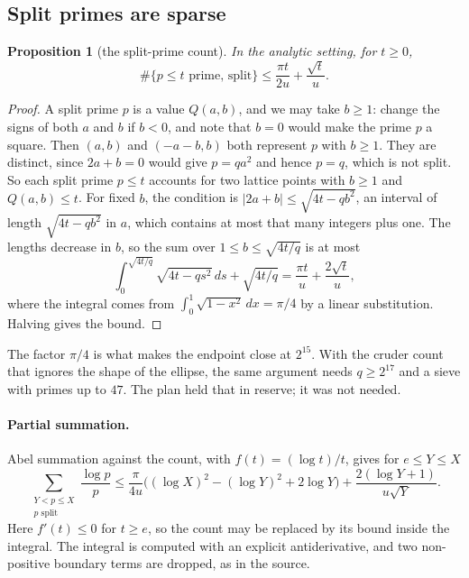 \documentclass[11pt]{article}
\newtheorem{proposition}[theorem]{Proposition}
\theoremstyle{definition}
\begin{document}
\subsection{Split primes are sparse}\label{sec:split}

\begin{proposition}[the split-prime count]\label{prop:count}
In the analytic setting, for $t \ge 0$,
\[
\#\{p \le t \text{ prime, split}\} \le \frac{\pi t}{2u} + \frac{\sqrt t}{u}.
\]
\end{proposition}

\begin{proof}
A split prime $p$ is a value $Q(a, b)$, and we may take $b \ge 1$: change the signs of both $a$ and $b$ if $b < 0$, and note that $b = 0$ would make the prime $p$ a square. Then $(a, b)$ and $(-a-b, b)$ both represent $p$ with $b \ge 1$. They are distinct, since $2a + b = 0$ would give $p = qa^2$ and hence $p = q$, which is not split. So each split prime $p \le t$ accounts for two lattice points with $b \ge 1$ and $Q(a, b) \le t$. For fixed $b$, the condition is $|2a + b| \le \sqrt{4t - qb^2}$, an interval of length $\sqrt{4t - qb^2}$ in $a$, which contains at most that many integers plus one. The lengths decrease in $b$, so the sum over $1 \le b \le \sqrt{4t/q}$ is at most
\[
\int_0^{\sqrt{4t/q}} \sqrt{4t - qs^2}\,ds + \sqrt{4t/q} = \frac{\pi t}{u} + \frac{2\sqrt t}{u},
\]
where the integral comes from $\int_0^1 \sqrt{1 - x^2}\,dx = \pi/4$ by a linear substitution. Halving gives the bound.
\end{proof}

The factor $\pi/4$ is what makes the endpoint close at $2^{15}$. With the cruder count that ignores the shape of the ellipse, the same argument needs $q \ge 2^{17}$ and a sieve with primes up to $47$. The plan held that in reserve; it was not needed.

\paragraph{Partial summation.} Abel summation against the count, with $f(t) = (\log t)/t$, gives for $e \le Y \le X$
\[
\sum_{\substack{Y < p \le X\\ p \text{ split}}} \frac{\log p}{p} \le \frac{\pi}{4u}\bigl((\log X)^2 - (\log Y)^2 + 2\log Y\bigr) + \frac{2(\log Y + 1)}{u\sqrt Y}. \tag{7}
\]
Here $f'(t) \le 0$ for $t \ge e$, so the count may be replaced by its bound inside the integral. The integral is computed with an explicit antiderivative, and two non-positive boundary terms are dropped, as in the source.
\end{document}

